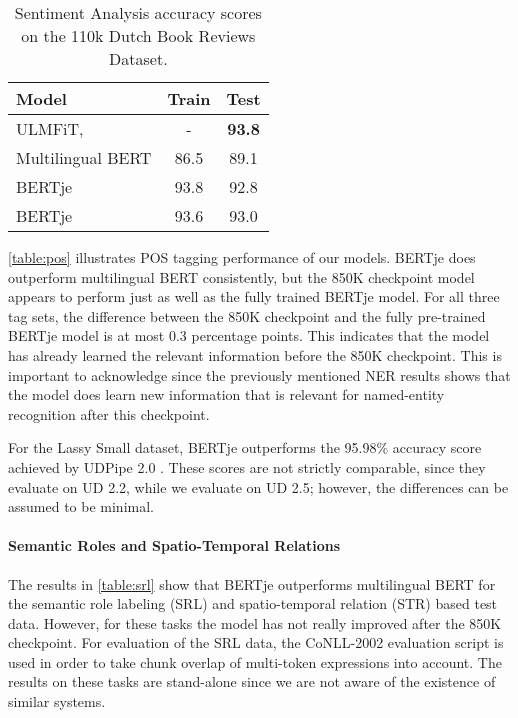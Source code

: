 \documentclass[11pt]{article}
\begin{document}
\begin{table}[H]
\begin{center}
  \begin{tabular}{l || c c}
    \toprule
    Model             & Train & Test \\
    \midrule
    ULMFiT, \citet{burgh2019merits} & -   & \textbf{93.8} \\
    \midrule
    Multilingual BERT & 86.5 & 89.1 \\
    BERTje   & 93.8 & 92.8 \\
    BERTje            & 93.6 & 93.0 \\
    \bottomrule
  \end{tabular}
   \caption{\label{table:sent}Sentiment Analysis accuracy scores on the 110k Dutch Book Reviews Dataset.}
\end{center}
\end{table}

\autoref{table:pos} illustrates POS tagging performance of our models. BERTje does outperform multilingual BERT consistently, but the 850K checkpoint model appears to perform just as well as the fully trained BERTje model.
For all three tag sets, the difference between the 850K checkpoint and the fully pre-trained BERTje model is at most 0.3 percentage points.
This indicates that the model has already learned the relevant information before the 850K checkpoint.
This is important to acknowledge since the previously mentioned NER results shows that the model does learn new information that is relevant for named-entity recognition after this checkpoint.

For the Lassy Small dataset, BERTje outperforms the 95.98\% accuracy score achieved by UDPipe 2.0 \citep{straka2018udpipe}.
These scores are not strictly comparable, since they evaluate on UD 2.2, while we evaluate on UD 2.5; however, the differences can be assumed to be minimal.

\paragraph{Semantic Roles and Spatio-Temporal Relations}



The results in \autoref{table:srl} show that BERTje outperforms multilingual BERT for the semantic role labeling (SRL) and spatio-temporal relation (STR) based test data.
However, for these tasks the model has not really improved after the 850K checkpoint. 
For evaluation of the SRL data, the CoNLL-2002 evaluation script is used in order to take chunk overlap of multi-token expressions into account.
The results on these tasks are stand-alone since we are not aware of the existence of similar systems.
\end{document}
